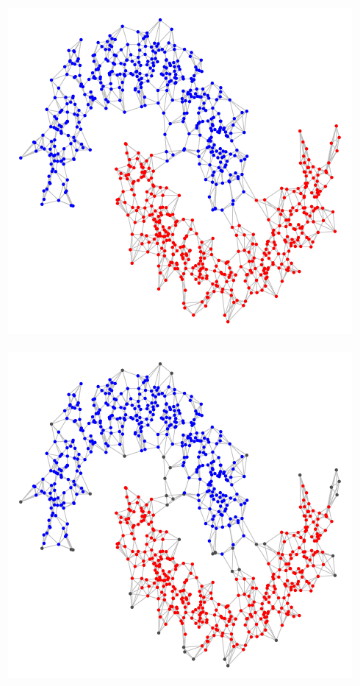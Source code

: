 \documentclass{article}
\newcommand{\1}{\mathbf{1}}
\theoremstyle{aldenthm}
\theoremstyle{aldenrmrk}
\begin{document}
\begin{figure}
\begin{adjustbox}{minipage=\linewidth,scale=0.8}
\begin{subfigure}{.24\linewidth}
			\caption{}
		\end{subfigure}
		\begin{subfigure}{.24\linewidth}
			\includegraphics[width=\linewidth]{example2plots/row2_conductance_cluster}
			\caption{}
		\end{subfigure}
		\begin{subfigure}{.24\linewidth}
			\includegraphics[width=\linewidth]{example2plots/row2_density_cluster}
			\caption{}
		\end{subfigure}
		

\end{adjustbox}
\end{figure}
\end{document}
